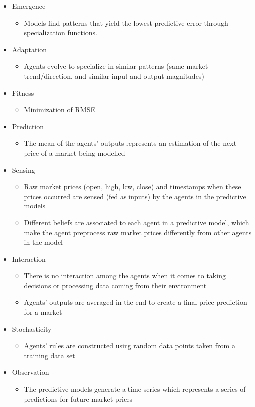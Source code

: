 \documentclass{ieeeaccess}
\begin{document}
\begin{itemize}
\item Emergence
  \begin{itemize}
  \item Models find patterns that yield the lowest predictive error through specialization functions.
  \end{itemize}
\item Adaptation
  \begin{itemize}
  \item Agents evolve to specialize in similar patterns (same market trend/direction, and similar input and output magnitudes)
  \end{itemize}
\item Fitness
  \begin{itemize}
  \item Minimization of RMSE
  \end{itemize}
\item Prediction
  \begin{itemize}
  \item The mean of the agents' outputs represents an estimation of the next price of a market being modelled
  \end{itemize}
\item Sensing
  \begin{itemize}
  \item Raw market prices (open, high, low, close) and timestamps when these prices occurred are sensed (fed as inputs) by the agents in the predictive models
  \item Different beliefs are associated to each agent in a predictive model, which make the agent preprocess raw market prices differently from other agents in the model
  \end{itemize}
\item Interaction
  \begin{itemize}
  \item There is no interaction among the agents when it comes to taking decisions or processing data coming from their environment
  \item Agents' outputs are averaged in the end to create a final price prediction for a market
  \end{itemize}
\item Stochasticity
  \begin{itemize}
  \item Agents' rules are constructed using random data points taken from a training data set
  \end{itemize}
\item Observation
  \begin{itemize}
  \item The predictive models generate a time series which represents a series of predictions for future market prices
  \end{itemize}
\end{itemize}
\end{document}

